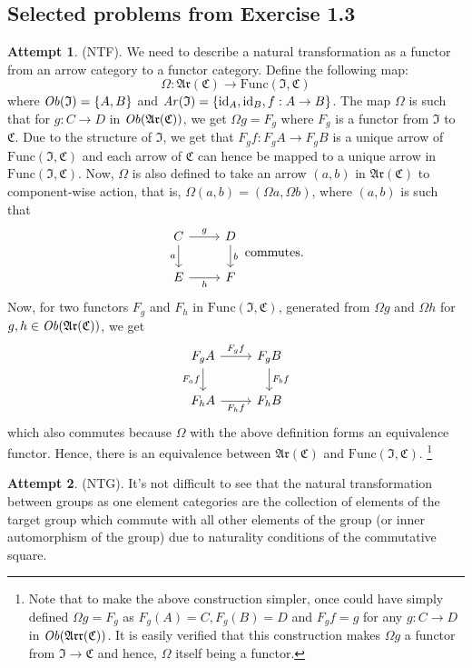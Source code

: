 \documentclass{article}
\theoremstyle{definition}
\theoremstyle{remark}
\theoremstyle{definition}
\theoremstyle{definition}
\theoremstyle{definition}
\newtheorem*{attempt}{Attempt}
\newcommand{\cat}[1]{\mathfrak{#1}}
\newcommand{\obj}[1]{\text{\textit{Ob}}(#1)}
\newcommand{\arr}[1]{\text{\textit{Ar}}(#1)}
\newcommand{\Id}[1]{\text{id}_{#1}}
\newcommand{\Func}[2]{\text{Func}\left (#1,#2\right )}
\begin{document}
\subsection{Selected problems from Exercise 1.3}
\begin{attempt}{(NTF).}  
We need to describe a natural transformation as a functor from an arrow category to a functor category. Define the following map:
\[\Omega :\cat{Ar(C)} \longrightarrow \Func{\cat{I}}{\cat{C}}\]
where $ \obj{\cat{I}} = \{A,B\}  $ and $ \arr{\cat{I}} =\{\Id{A}, \Id{B}, f : A\to B\} $. The map $ \Omega  $ is such that for $ g : C\to D$ in $ \obj{\cat{Ar(C)}} $, we get $ \Omega g = F_g $ where $ F_g $ is a functor from $ \cat{I} $ to $ \cat{C} $. Due to the structure of $ \cat{I} $, we get that $ F_g f : F_g A \to F_g B $ is a unique arrow of $ \Func{\cat{I}}{\cat{C}} $ and each arrow of $ \cat{C} $ can hence be mapped to a unique arrow in $ \Func{\cat{I}}{\cat{C}} $. Now, $ \Omega $ is also defined to take an arrow $ (a,b) $ in $ \cat{Ar(C)} $ to component-wise action, that is, $ \Omega (a,b) = (\Omega a, \Omega b) $, where $ (a,b) $ is such that
\[\begin{tikzcd}
	C \arrow[swap]{d}{a}\arrow{r}{g} &D\arrow{d}{b}\\
	E\arrow[swap]{r}{h} &F
\end{tikzcd}\;\text{commutes.}\] 
Now, for two functors $ F_g $ and $ F_h $ in $ \Func{\cat{I}}{\cat{C}} $, generated from $ \Omega g $ and $ \Omega h $ for $ g,h \in \obj{\cat{Ar(C)}} $, we get 
\[\begin{tikzcd}
	F_g A \arrow[swap]{d}{F_a f}\arrow{r}{F_gf} &F_g B\arrow{d}{F_bf}\\
	F_h A \arrow[swap]{r}{F_hf} &F_h B
\end{tikzcd}\]
which also commutes because $ \Omega $ with the above definition forms an equivalence functor. Hence, there is an equivalence between $ \cat{Ar(C)} $ and $ \Func{\cat{I}}{\cat{C}} $. \footnote{Note that to make the above construction simpler, once could have simply defined $ \Omega g = F_g  $ as $ F_g(A) = C, F_g(B) = D $ and $ F_gf = g $ for any $ g:C\to D $ in $ \obj{\cat{Arr(C)}} $. It is easily verified that this construction makes $ \Omega g $ a functor from $ \cat{I}\to \cat{C} $ and hence, $ \Omega $ itself being a functor.}
\end{attempt}
\begin{attempt}{(NTG).} 
	It's not difficult to see that the natural transformation between groups as one element categories are the collection of elements of the target group which commute with all other elements of the group (or inner automorphism of the group) due to naturality conditions of the commutative square.
\end{attempt}
\newpage
\end{document}
